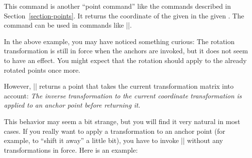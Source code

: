 \begin{command}{\pgfpointanchor{}}
  This command is another ``point command'' like the commands
  described in Section~\ref{section-points}. It returns the coordinate
  of the given  in the given . The command can
  be used in commands like |\pgfpathmoveto|.

\begin{codeexample}[]
\begin{pgfpicture}

\end{pgfpicture}
\end{codeexample}

  In the above example, you may have noticed something curious: The
  rotation transformation is still in force when the anchors are
  invoked, but it does not seem to have an effect. You might expect
  that the rotation should apply to the already rotated points once
  more.

  However, |\pgfpointanchor| returns a point that takes the current
  transformation matrix into account: \emph{The inverse transformation
    to the current coordinate transformation is applied to an anchor
    point before returning it.}

  This behavior may seem a bit strange, but you will find it very
  natural in most cases. If you really want to apply a transformation
  to an anchor point (for example, to ``shift it away'' a little bit),
  you have to invoke |\pgfpointanchor| without any transformations in
  force. Here is an example:

\makeatletter
\begin{codeexample}[]
\begin{pgfpicture}

  {
    \pgftransformreset
    \xdef\mycoordinate{\noexpand\pgfpoint{\the\pgf@x}{\the\pgf@y}}
  }
    
  \pgfpathcircle{\mycoordinate}{2pt}
\end{pgfpicture}
\end{codeexample}


\end{command}
